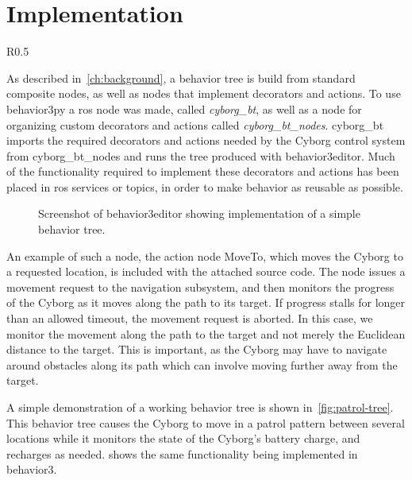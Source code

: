\documentclass[\rootfolder/main.tex]{subfiles}
\begin{document}

\section{Implementation}

\begin{wrapfigure}{R}{0.5\columnwidth}
    \caption{Behavior tree that checks battery state, and charges if necessary, while patrolling.}
    \label{fig:patrol-tree}
\end{wrapfigure}

As described in~\cref{ch:background}, a behavior tree is build from standard composite nodes, as well as nodes that implement decorators and actions.
To use behavior3py a \acrshort{ros} node was made, called \emph{cyborg\_bt}, as well as a node for organizing custom decorators and actions called \emph{cyborg\_bt\_nodes}.
cyborg\_bt imports the required decorators and actions needed by the Cyborg control system from cyborg\_bt\_nodes and runs the tree produced with behavior3editor.
Much of the functionality required to implement these decorators and actions has been placed in \acrshort{ros} services or topics, in order to make behavior as reusable as possible.

\begin{figure}[h]
    \caption{Screenshot of behavior3editor showing implementation of a simple behavior tree.}
    \label{fig:b3editor}
\end{figure}

An example of such a node, the action node MoveTo, which moves the Cyborg to a requested location, is included with the attached source code.
The node issues a movement request to the navigation subsystem, and then monitors the progress of the Cyborg as it moves along the path to its target.
If progress stalls for longer than an allowed timeout, the movement request is aborted.
In this case, we monitor the movement along the path to the target and not merely the Euclidean distance to the target.
This is important, as the Cyborg may have to navigate around obstacles along its path which can involve moving further away from the target.

A simple demonstration of a working behavior tree is shown in~\cref{fig:patrol-tree}.
This behavior tree causes the Cyborg to move in a patrol pattern between several locations while it monitors the state of the Cyborg's battery charge, and recharges as needed.
 shows the same functionality being implemented in behavior3.
\end{document}
